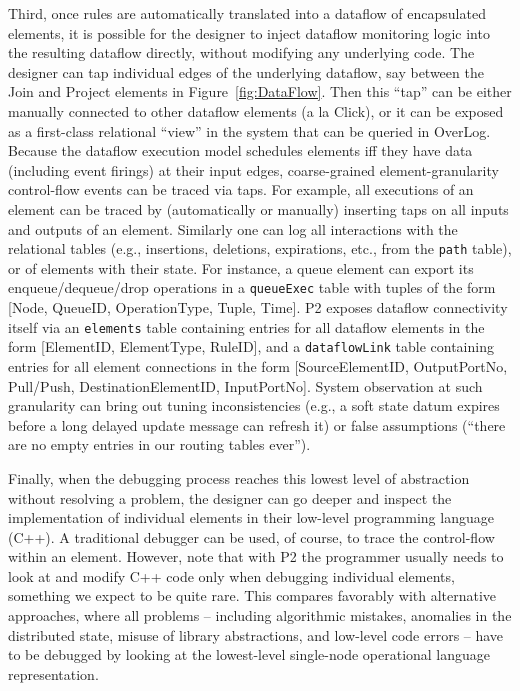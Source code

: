 \documentclass[10pt,twocolumn]{article}
\def\Sys{P2\xspace}
\def\Lang{OverLog\xspace}
\newcommand{\ol}[1]{{\tt\footnotesize#1}}
\begin{document}
Third, once rules are automatically translated into a dataflow of
encapsulated elements, it is possible for the designer to inject
dataflow monitoring logic into the resulting dataflow directly,
without modifying any underlying code.  The designer can tap
individual edges of the underlying dataflow, say between the Join and
Project elements in Figure~\ref{fig:DataFlow}.  Then this ``tap'' can
be either manually connected to other dataflow elements (a la Click),
or it can be exposed as a first-class relational ``view'' in the
system that can be queried in \Lang.  Because the dataflow execution
model schedules elements iff they have data (including event firings)
at their input edges, coarse-grained element-granularity control-flow
events can be traced via taps.  For example, all executions of an
element can be traced by (automatically or manually) inserting taps on
all inputs and outputs of an element.  Similarly one can log all interactions with
the relational tables (e.g., insertions, deletions, expirations, etc.,
from the \ol{path} table), or of elements with their state.
For instance, a queue
element can export its enqueue/dequeue/drop operations in a \ol{queueExec} table with tuples of the form [Node, QueueID, OperationType,
Tuple, Time].  \Sys exposes dataflow
connectivity itself via an \ol{elements} table containing entries for
all dataflow elements in the form [ElementID, ElementType, RuleID],
and a \ol{dataflowLink} table containing entries for all element
connections in the form [SourceElementID, OutputPortNo, Pull/Push,
DestinationElementID, InputPortNo].  System observation at such
granularity can bring out tuning inconsistencies (e.g., a soft state
datum expires before a long delayed update message can refresh it) or
false assumptions (``there are no empty entries in our routing tables
ever'').


Finally, when the debugging process reaches this lowest level of
abstraction without resolving a problem, the designer can go deeper and
inspect the implementation of individual elements in their low-level
programming language (C++). A traditional debugger can be
used, of course, to trace the control-flow within an element.
However, note
that with \Sys the programmer usually needs to look at and modify C++ code only
when debugging individual elements, something we expect to be quite
rare.  This compares favorably
with alternative approaches, where all problems -- including
algorithmic mistakes, anomalies in the distributed state, misuse of
library abstractions, and low-level code errors -- have to be debugged
by looking at the lowest-level single-node operational language
representation.
\end{document}
